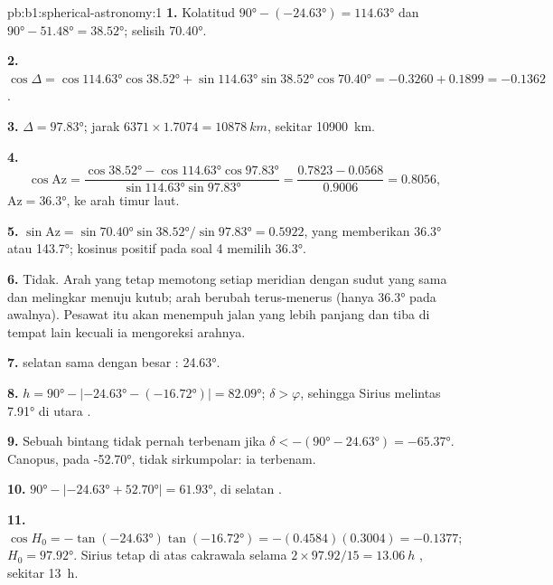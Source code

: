 \begin{solution}{pb:b1:spherical-astronomy:1}
\textbf{1.} Kolatitud $\ang{90} - (\ang{-24.63}) = \ang{114.63}$ dan
$\ang{90} - \ang{51.48} = \ang{38.52}$; selisih  \ang{70.40}.

\textbf{2.} $\cos\Delta = \cos\ang{114.63}\cos\ang{38.52} +
\sin\ang{114.63}\sin\ang{38.52}\cos\ang{70.40} = -0.3260 + 0.1899 =
-0.1362$.

\textbf{3.} $\Delta = \ang{97.83}$; jarak $6371\times1.7074 =
\qty{10878}{km}$, sekitar \qty{10900}{km}.

\textbf{4.}
\[
  \cos\mathrm{Az} = \frac{\cos\ang{38.52} - \cos\ang{114.63}\cos\ang{97.83}}
  {\sin\ang{114.63}\sin\ang{97.83}} = \frac{0.7823 - 0.0568}{0.9006} = 0.8056 ,
\]
$\mathrm{Az} = \ang{36.3}$, ke arah timur laut.

\textbf{5.} $\sin\mathrm{Az} = \sin\ang{70.40}\sin\ang{38.52}/\sin\ang{97.83}
= 0.5922$, yang memberikan \ang{36.3} atau \ang{143.7}; kosinus positif pada
soal 4 memilih \ang{36.3}.

\textbf{6.} Tidak. Arah yang tetap memotong setiap meridian dengan sudut yang sama dan
melingkar menuju kutub; arah  berubah terus-menerus
(hanya \ang{36.3} pada awalnya). Pesawat itu akan menempuh jalan yang lebih panjang
dan tiba di tempat lain kecuali ia mengoreksi arahnya.

\textbf{7.}   selatan sama dengan besar : \ang{24.63}.

\textbf{8.} $h = \ang{90} - |\ang{-24.63} - (\ang{-16.72})| = \ang{82.09}$;
$\delta > \varphi$, sehingga Sirius melintas \ang{7.91} di utara .

\textbf{9.} Sebuah bintang tidak pernah terbenam jika $\delta < -(\ang{90} - \ang{24.63}) =
\ang{-65.37}$. Canopus, pada \ang{-52.70}, tidak sirkumpolar: ia terbenam.

\textbf{10.} $\ang{90} - |\ang{-24.63} + \ang{52.70}| = \ang{61.93}$, di selatan
.

\textbf{11.} $\cos H_0 = -\tan(\ang{-24.63})\tan(\ang{-16.72}) =
-(0.4584)(0.3004) = -0.1377$; $H_0 = \ang{97.92}$. Sirius tetap di atas cakrawala
selama $2\times97.92/15 = \qty{13.06}{h}$ , sekitar \qty{13}{h}.


\end{solution}
